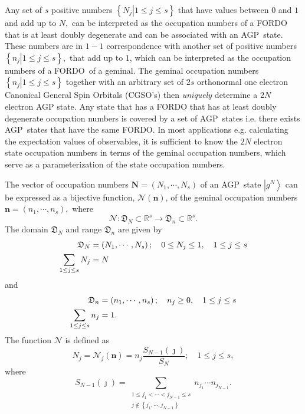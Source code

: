 \documentclass{preprint}
\begin{document}
Any set of $s$ positive numbers $\left\{ \left. N_{j}\right\vert 1\leq j\leq
s\right\} $ that have values between $0$ and $1$ and add up to $N,$ can be
interpreted as the occupation numbers of a FORDO that is at least doubly
degenerate and can be associated with an AGP\ state. These numbers are in $%
1-1$ correspondence with another set of positive numbers $\left\{ \left.
n_{j}\right\vert 1\leq j\leq s\right\} ,$ that add up to $1$, which can be
interpreted as the occupation numbers of a FORDO\ of a geminal. The geminal
occupation numbers $\left\{ \left. n_{j}\right\vert 1\leq j\leq s\right\} $
together with an arbitrary set of $2s$ orthonormal one electron Canonical
General Spin Orbitals (CGSO's) then \emph{uniquely }determine a $2N$
electron AGP state. Any state that has a FORDO that has at least doubly
degenerate occupation numbers is covered by a set of AGP\ states i.e. there
exists AGP\ states that have the same FORDO. In most applications e.g.
calculating the expectation values of observables, it is sufficient to know
the $2N$ electron state occupation numbers in terms of the geminal
occupation numbers, which serve as a parameterization of the state
occupation numbers.

The vector of occupation numbers $\mathbf{N}=\left( N_{1},\cdots
,N_{s}\right) $ of an AGP\ state $\left\vert g^{N}\right\rangle $ can be
expressed as a bijective function, $\mathcal{N}\left( \mathbf{n}\right) $,
of the geminal occupation numbers $\mathbf{n}=\left( n_{1},\cdots
,n_{s}\right) ,$ where
\begin{equation}
\mathcal{N}:\mathfrak{D}_{N}\subset\mathbb{R}^{s}\rightarrow\mathfrak{D}%
_{n}\subset\mathbb{R}^{s}.
\end{equation}
The domain $\mathfrak{D}_{N}$ and range $\mathfrak{D}_{n}$ are given by%
\begin{align}
\mathfrak{D}_{N} & =\left( N_{1},\cdots,N_{s}\right) ;\quad0\leq
N_{j}\leq1,\quad1\leq j\leq s  \notag \\
\sum_{1\leq j\leq s}N_{j} & =N
\end{align}
and
\begin{align}
\mathfrak{D}_{n} & =\left( n_{1},\cdots,n_{s}\right) ;\quad
n_{j}\geq0,\quad1\leq j\leq s  \notag \\
\sum_{1\leq j\leq s}n_{j} & =1.
\end{align}
The function $\mathcal{N}$ is defined as
\begin{equation}
N_{j}=\mathcal{N}_{j}\left( \mathbf{n}\right) =n_{j}\frac{S_{N-1}\left(
\jmath\right) }{S_{N}};\quad1\leq j\leq s,
\end{equation}
where
\begin{equation}
S_{N-1}\left( \jmath\right) =\sum_{\substack{ 1\leq j_{1}<\cdots<j_{N-1}\leq
s  \\ j\notin\left\{ j_{1},\cdots,j_{N-1}\right\} }}n_{j_{1}}\cdots
n_{j_{N-1}}.
\end{equation}
\end{document}
